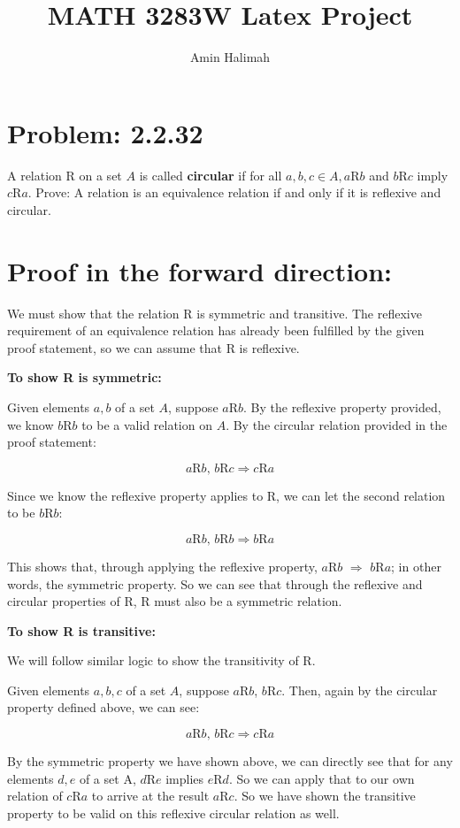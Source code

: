 \documentclass[12pt]{article}
\title{MATH 3283W Latex Project}
\author{Amin Halimah}
\date{}
\begin{document}
	
	\maketitle
	
	\section*{Problem: 2.2.32}
	
	A relation R on a set $A$ is called \textbf{circular} if for all $a, b, c \in A, a$R$b$ and $b$R$c$ imply $c$R$a$. Prove: A relation is an equivalence relation if and only if it is reflexive and circular.
	
	\section*{Proof in the forward direction:}
	
	We must show that the relation R is symmetric and transitive. The reflexive requirement of an equivalence relation has already been fulfilled by the given proof statement, so we can assume that R is reflexive.
	
	\bigskip
	\textbf{To show R is symmetric:}
	
	Given elements $a,b$ of a set $A$, suppose $a$R$b$. By the reflexive property provided, we know $b$R$b$ to be a valid relation on $A$. By the circular relation provided in the proof statement:
	
	$$ \text{$a$R$b$, $b$R$c$} \Rightarrow \text{$c$R$a$} $$

	Since we know the reflexive property applies to R, we can let the second relation to be $b$R$b$:

	$$	\text{$a$R$b$, $b$R$b$} \Rightarrow \text{$b$R$a$} $$
	

	This shows that, through applying the reflexive property, $a$R$b$ $\Rightarrow$ $b$R$a$; in other words, the symmetric property. So we can see that through the reflexive and circular properties of R, R must also be a symmetric relation.
	
	\bigskip
	\textbf{To show R is transitive:}
	
	We will follow similar logic to show the transitivity of R. 
	
	Given elements $a,b,c$ of a set $A$, suppose $a$R$b$, $b$R$c$. Then, again by the circular property defined above, we can see:
	
	$$ \text{$a$R$b$, $b$R$c$} \Rightarrow \text{$c$R$a$} $$

	By the symmetric property we have shown above, we can directly see that for any elements $d,e$ of a set A, $d$R$e$ implies $e$R$d$. So we can apply that to our own relation of $c$R$a$ to arrive at the result $a$R$c$. So we have shown the transitive property to be valid on this reflexive circular relation as well.
	
\end{document}
